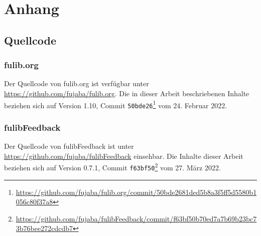 \chapter{Anhang}\label{ch:appendix}

\section{Quellcode}

\subsection{fulib.org}

Der Quellcode von fulib.org ist verfügbar unter \url{https://github.com/fujaba/fulib.org}.
Die in dieser Arbeit beschriebenen Inhalte beziehen sich auf Version 1.10, Commit \texttt{50bde26}\footnote{\url{https://github.com/fujaba/fulib.org/commit/50bde2681ded5b8a3f5ff5d5580b1056c80f37a8}} vom 24. Februar 2022.

\subsection{fulibFeedback}

Der Quellcode von fulibFeedback ist unter \url{https://github.com/fujaba/fulibFeedback} einsehbar.
Die Inhalte dieser Arbeit beziehen sich auf Version 0.7.1, Commit \texttt{f63bf50}\footnote{\url{https://github.com/fujaba/fulibFeedback/commit/f63bf50b70ed7a7b69b23bc73b76bee272cdcdb7}} vom 27. März 2022.
